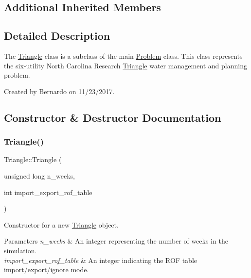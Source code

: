 \subsection*{Additional Inherited Members}


\subsection{Detailed Description}
The {\ttfamily \mbox{\hyperlink{classTriangle}{Triangle}}} class is a subclass of the main {\ttfamily \mbox{\hyperlink{classProblem}{Problem}}} class. This class represents the six-\/utility North Carolina Research \mbox{\hyperlink{classTriangle}{Triangle}} water management and planning problem. 

Created by Bernardo on 11/23/2017. 

\subsection{Constructor \& Destructor Documentation}
\mbox{\label{classTriangle_a24833bad242ddc3f671b36678dff5738}} 
\subsubsection{\texorpdfstring{Triangle()}{Triangle()}}
{\footnotesize\ttfamily Triangle\+::\+Triangle (\begin{DoxyParamCaption}\item[{unsigned long}]{n\+\_\+weeks,  }\item[{int}]{import\+\_\+export\+\_\+rof\+\_\+table }\end{DoxyParamCaption})}



Constructor for a new \mbox{\hyperlink{classTriangle}{Triangle}} object. 


\begin{DoxyParams}{Parameters}
{\em n\+\_\+weeks} & An integer representing the number of weeks in the simulation. \\
\hline
{\em import\+\_\+export\+\_\+rof\+\_\+table} & An integer indicating the R\+OF table import/export/ignore mode. \\
\hline
\end{DoxyParams}
\mbox{\label{classTriangle_a5199760a17454f4dc94c855a57e3a152}} 
